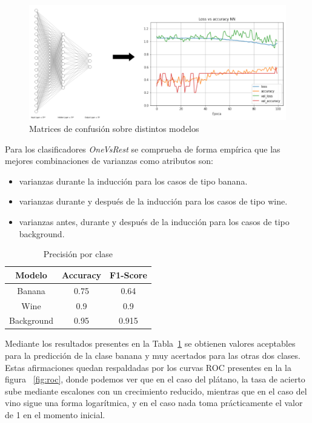 \documentclass{esannV2}
\begin{document}
\begin{figure}[b!]
\centering
\includegraphics[scale=0.3]{img/nn.png}
\caption{Matrices de confusión sobre distintos modelos}\label{fig:nn}
\end{figure}

Para los clasificadores \textit{OneVsRest} se comprueba de forma empírica que las mejores combinaciones de varianzas como atributos son:\\

\begin{itemize}
  \item varianzas durante la inducción para los casos de tipo banana.
  \item varianzas durante y después de la inducción para los casos de tipo wine.
  \item varianzas antes, durante y después de la inducción para los casos de tipo background.
\end{itemize}


\begin{table}[!]
  \centering
  \begin{tabular}{|c|c|c|}
    \hline
    Modelo & Accuracy & F1-Score \\
    \hline
    Banana & 0.75 & 0.64 \\ 
	Wine & 0.9 & 0.9 \\ 
	Background & 0.95 & 0.915 \\ 
    \hline
  \end{tabular}
  \caption{Precisión por clase}\label{tab:lazypred}
\end{table}

Mediante los resultados presentes en la Tabla~\ref{tab:lazypred} se obtienen valores aceptables para la predicción de la clase banana y muy acertados para las otras dos clases. Estas afirmaciones quedan respaldadas por los curvas ROC presentes en la la figura ~\ref{fig:roc}, donde podemos ver que en el caso del plátano, la tasa de acierto sube mediante escalones con un crecimiento reducido, mientras que en el caso del vino sigue una forma logarítmica, y en el caso nada toma prácticamente el valor de 1 en el momento inicial. \\
\end{document}
